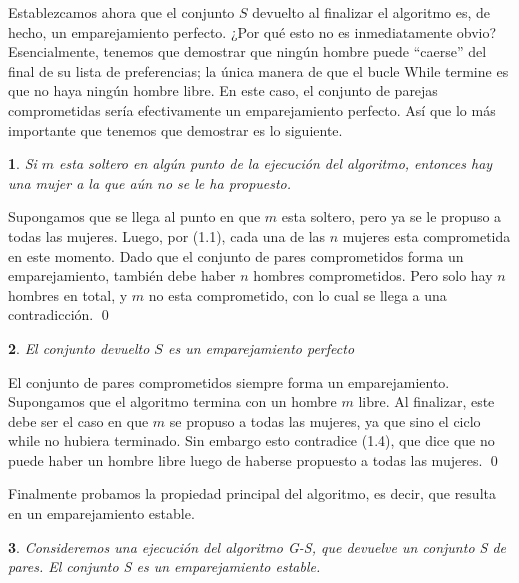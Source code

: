 \documentclass[a4paper, 12pt]{book}
\theoremstyle{dotless}
\newtheorem{theorem}{}[section]
\renewenvironment{proof}{\vspace{12pt}{\noindent\bfseries Demostración.}}{\qed\vspace{12pt}}
\begin{document}
Establezcamos ahora que el conjunto $S$ devuelto al finalizar el
algoritmo es, de hecho, un emparejamiento perfecto. ¿Por qué esto no es inmediatamente obvio?
Esencialmente, tenemos que demostrar que ningún hombre puede ``caerse'' del final de su lista de preferencias; la única manera de que el bucle While termine es que no haya ningún hombre libre.
En este caso, el conjunto de parejas comprometidas sería efectivamente un emparejamiento perfecto.
Así que lo más importante que tenemos que demostrar es lo siguiente.

\vspace{12pt}
\begin{theorem}
Si $m$ esta soltero en algún punto de la ejecución del algoritmo, entonces hay una mujer a la que aún no se le ha propuesto.
\end{theorem}

\begin{proof}
Supongamos que se llega al punto en que $m$ esta soltero, pero ya se le propuso a todas las mujeres. Luego, por (1.1), cada una de las $n$ mujeres esta comprometida en este momento. Dado que el conjunto de pares comprometidos forma un emparejamiento, también debe haber $n$ hombres comprometidos. Pero solo hay $n$ hombres en total, y $m$ no esta comprometido, con lo cual se llega a una contradicción. 
\end{proof}

\begin{theorem}
El conjunto devuelto $S$ es un emparejamiento perfecto
\label{thm:1.5}
\end{theorem}

\begin{proof}
El conjunto de pares comprometidos siempre forma un emparejamiento. Supongamos que el algoritmo termina con un hombre $m$ libre. Al finalizar, este debe ser el caso en que $m$ se propuso a todas las mujeres, ya que sino el ciclo while no hubiera terminado. Sin embargo esto contradice (1.4), que dice que no puede haber un hombre libre luego de haberse propuesto a todas las mujeres.
\end{proof}

Finalmente probamos la propiedad principal del algoritmo, es decir, que resulta en un emparejamiento estable.

\vspace{12pt}
\noindent\colorbox{mygray}{\parbox{0.98\textwidth}{
\begin{theorem}
Consideremos una ejecución del algoritmo G-S, que devuelve un conjunto S de pares. El conjunto S es un emparejamiento estable.
\end{theorem}
}}
\end{document}
